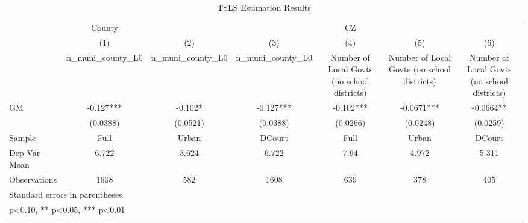 \begin{table}[htbp]\centering
\def\sym#1{\ifmmode^{#1}\else\(^{#1}\)\fi}
\caption{TSLS Estimation Results}
\begin{tabular}{l*{6}{c}}
\toprule
                    &      County   &               &               &          CZ   &               &               \\
                    &\multicolumn{1}{c}{(1)}&\multicolumn{1}{c}{(2)}&\multicolumn{1}{c}{(3)}&\multicolumn{1}{c}{(4)}&\multicolumn{1}{c}{(5)}&\multicolumn{1}{c}{(6)}\\
                    &\multicolumn{1}{c}{n\_muni\_county\_L0}&\multicolumn{1}{c}{n\_muni\_county\_L0}&\multicolumn{1}{c}{n\_muni\_county\_L0}&\multicolumn{1}{c}{Number of Local Govts (no school districts)}&\multicolumn{1}{c}{Number of Local Govts (no school districts)}&\multicolumn{1}{c}{Number of Local Govts (no school districts)}\\
\midrule
GM                  &      -0.127***&      -0.102*  &      -0.127***&      -0.102***&     -0.0671***&     -0.0664** \\
                    &    (0.0388)   &    (0.0521)   &    (0.0388)   &    (0.0266)   &    (0.0248)   &    (0.0259)   \\
\midrule
Sample              &        Full   &       Urban   &      DCourt   &        Full   &       Urban   &      DCourt   \\
Dep Var Mean        &       6.722   &       3.624   &       6.722   &        7.94   &       4.972   &       5.311   \\
Observations        &        1608   &         582   &        1608   &         639   &         378   &         405   \\
\bottomrule
\multicolumn{7}{l}{\footnotesize Standard errors in parentheses}\\
\multicolumn{7}{l}{\footnotesize * p<0.10, ** p<0.05, *** p<0.01}\\
\end{tabular}
\end{table}
